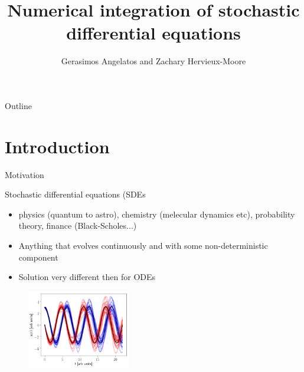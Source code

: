 \documentclass[]{beamer}
\title[] %
{Numerical integration of stochastic differential equations}
\author[] {Gerasimos Angelatos and  Zachary Hervieux-Moore
}
\institute[] {
\\[\medskipamount]
}
\date[] {}
\begin{document}
\AtBeginNote{\hspace*{-35pt} \begin{minipage}{1.15\textwidth} }
\AtEndNote{\end{minipage}}



\begin{frame}
 \titlepage
\end{frame}


\begin{frame}[noframenumbering]{Outline}
 \tableofcontents

\end{frame}

\section{Introduction}


\begin{frame}{Motivation}

\begin{block}{Stochastic differential equations (SDEs}
\begin{itemize}
\item physics (quantum to astro), chemistry (melecular dynamics etc), probability theory, finance (Black-Scholes...)
\item Anything that evolves continuously and with some non-deterministic component
\end{itemize}
\end{block}
\begin{itemize}
  \setlength\itemsep{0.75em}
 \item Solution very different then for ODEs
\end{itemize}


\begin{figure}[t]
\vspace{-1pt}
\captionsetup[figure]{labelformat=empty}
\includegraphics[width=0.4\textwidth]{sampleSDE.png}
\end{figure}
\end{frame}
\end{document}
